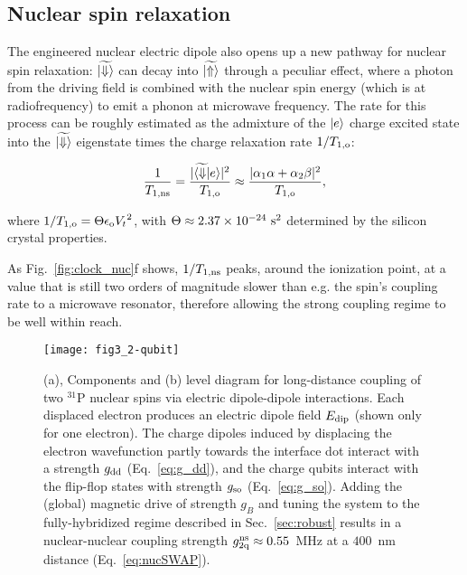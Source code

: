 \documentclass[
 aps,prb,twocolumn,
 amsmath,amssymb,superscriptaddress,
] {revtex4-1}
\begin{document}
\subsection{Nuclear spin relaxation}

The engineered nuclear electric dipole also opens up a new pathway for nuclear spin relaxation: $\widetilde{\ket{\Downarrow}}$ can decay into $\widetilde{\ket{\Uparrow}}$ through a peculiar effect, where a photon from the driving field is combined with the nuclear spin energy (which is at radiofrequency) to emit a phonon at microwave frequency. The rate for this process can be roughly estimated as the admixture of the $\ket{e}$ charge excited state into the $\widetilde{\ket{\Downarrow}}$ eigenstate times the charge relaxation rate ${1}/{T_{1,\rm o}}$:

\begin{equation}\label{eq:T1ff}
\frac{1}{T_{1,\rm ns}}=\frac{|\widetilde{\bra{\Downarrow}}e\rangle|^2}{T_{1,\rm o}}\approx \frac{|\alpha_1\alpha+\alpha_2\beta|^2}{{T_{1,\rm o}}},
\end{equation}

where ${1}/{T_{1,\rm o}}=\Theta\epsilon_{\rm o}{V_t}^2$,  with $\Theta\approx2.37\times10^{-24}~{\rm s}^2$ determined by the silicon crystal properties. 

As Fig.~\ref{fig:clock_nuc}f shows, ${1}/{T_{1,\rm ns}}$ peaks, around the ionization point, at a value that is still two orders of magnitude slower than e.g. the spin's coupling rate to a microwave resonator, therefore allowing the strong coupling regime to be well within reach.


\begin{figure}
\centering
\texttt{[image: fig3\_2-qubit]}
\caption{
(a), Components and (b) level diagram for long-distance coupling of two $^{31}$P nuclear spins via electric dipole-dipole interactions. Each displaced electron produces an electric dipole field $E_{\rm dip}$ (shown only for one electron). The charge dipoles induced by displacing the electron wavefunction partly towards the interface dot interact with a strength $g_{\rm dd}$ (Eq.~\ref{eq:g_dd}), and the charge qubits interact with the flip-flop states with strength $g_{\rm so}$ (Eq.~\ref{eq:g_so}). Adding the (global) magnetic drive of strength $g_B$ and tuning the system to the fully-hybridized regime described in Sec.~\ref{sec:robust} results in a nuclear-nuclear coupling strength $g_{\rm 2q}^{\rm ns} \approx 0.55$~MHz at a $400$~nm distance (Eq.~\ref{eq:nucSWAP}).
}
\label{fig:2-qubit_nuc}
\end{figure}
\end{document}
